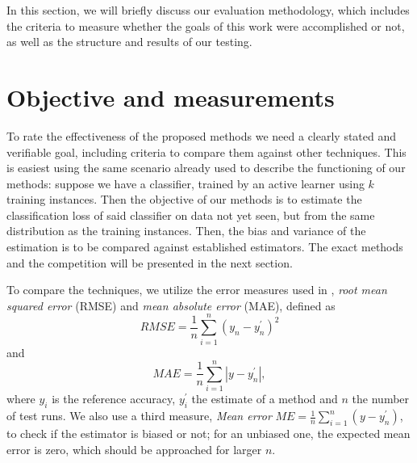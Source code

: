 \label{evaluation}

In this section, we will briefly discuss our evaluation methodology, which includes the criteria to measure whether the goals of this work were accomplished or not, as well as the structure and results of our testing.

\section{Objective and measurements}

To rate the effectiveness of the proposed methods we need a clearly stated and verifiable goal, including criteria to compare them against other techniques. This is easiest using the same scenario already used to describe the functioning of our methods: suppose we have a classifier, trained by an active learner using $k$ training instances. Then the objective of our methods is to estimate the classification loss of said classifier on data not yet seen, but from the same distribution as the training instances. Then, the bias and variance of the estimation is to be compared against established estimators. The exact methods and the competition will be presented in the next section.

To compare the techniques, we utilize the error measures used in \cite{FigueroaEtal2012}, \textit{root mean squared error} (RMSE) and \textit{mean absolute error} (MAE), defined as
\begin{equation}
RMSE = \frac{1}{n} \sum_{i=1}^{n} \left(y_n - y_n^{'}\right)^2
\end{equation}
and
\begin{equation}
MAE = \frac{1}{n} \sum_{i=1}^{n} \left|y - y_n^{'}\right|,
\end{equation}
where $y_i$ is the reference accuracy, $y_i^{'}$ the estimate of a method and $n$ the number of test runs. We also use a third measure, \textit{Mean error} $ME = \frac{1}{n} \sum_{i=1}^{n} \left(y - y_n^{'}\right)$, to check if the estimator is biased or not; for an unbiased one, the expected mean error is zero, which should be approached for larger $n$.

